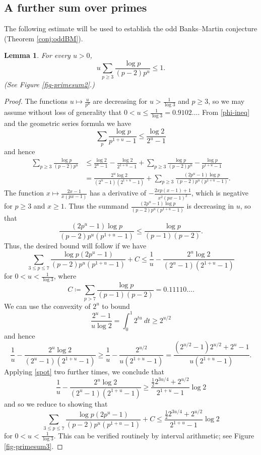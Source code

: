 \documentclass[12pt]{amsart}
\newtheorem{lemma}[theorem]{Lemma}
\theoremstyle{definition}
\theoremstyle{remark}
\numberwithin{equation}{section}
\newcommand{\1}{{\mathbf 1}}
\begin{document}
\subsection{A further sum over primes}


The following estimate will be used to establish the odd Banks--Martin conjecture (Theorem \ref{conj:oddBM}).

\begin{lemma} \label{lem:oddzeta}
    For every $u > 0$,
\begin{equation}\label{om2}
u \sum_{p \geq 3} \frac{\log p}{(p-2) p^u} \leq 1.
\end{equation}
(See Figure \ref{fig-primesum2}.)
\end{lemma}

\begin{proof}  The functions $u \mapsto \frac{u}{p^u}$ are decreasing for $u > \frac{1}{\log 3}$ and $p \geq 3$, so we may assume without loss of generality that $0 < u \leq \frac{1}{\log 3} = 0.9102\dots$.  From \eqref{phi-ineq} and the geometric series formula we have
$$ \sum_p \frac{\log p}{p^{1+u}-1} \leq \frac{\log 2}{2^u-1}$$
and hence
\begin{align*}
\sum_{p \geq 3} \frac{\log p}{(p-2) p^u} &\leq \frac{\log 2}{2^u-1} - \frac{\log 2}{2^{1+u}-1} + \sum_{p \geq 3} \frac{\log p}{(p-2) p^u} - \frac{\log p}{p^{1+u}-1} \\
    &= \frac{2^u \log 2}{(2^u-1) (2^{1+u}-1)} + \sum_{p \geq 3} \frac{(2p^u - 1)\log p }{(p-2)p^u (p^{1+u}-1)}.
\end{align*}
The function $x \mapsto \frac{2x-1}{x(px-1)}$ has a derivative of $-\frac{2xp(x-1)+1}{x^2 (px-1)^2}$, which is negative for $p \geq 3$ and $x \geq 1$.  Thus the summand $\frac{ (2p^u - 1)\log p }{(p-2)p^u (p^{1+u}-1)}$ is decreasing in $u$, so that
$$ \frac{(2p^u - 1)\log p }{(p-2)p^u (p^{1+u}-1)} \leq \frac{\log p}{(p-1) (p-2)}.$$
Thus, the desired bound will follow if we have
$$
\sum_{3 \leq p \leq 7} \frac{\log p (2p^u - 1)}{(p-2)p^u (p^{1+u}-1)} + C \leq \frac{1}{u} - \frac{2^u \log 2}{(2^u-1) (2^{1+u}-1)}
$$
for $0 < u < \frac{1}{\log 3}$, where
$$ C \coloneq \sum_{p > 7} \frac{\log p}{(p-1) (p-2)} = 0.11110\dots.$$
We can use the convexity of $2^u$ to bound
\begin{equation}\label{spot}
\frac{2^u - 1}{u \log 2} = \int_0^1 2^{tu}\ dt \geq 2^{u/2}
\end{equation}
and hence
$$ \frac{1}{u} - \frac{2^u \log 2}{(2^u-1) (2^{1+u}-1)} \geq \frac{1}{u} - \frac{2^{u/2}}{u(2^{1+u}-1)}
= \frac{(2^{u/2}-1)2^{u/2} + 2^u -1}{u(2^{1+u}-1)}.$$
Applying  \eqref{spot} two further times, we conclude that
$$ \frac{1}{u} - \frac{2^u \log 2}{(2^u-1) (2^{1+u}-1)} \geq \frac{\frac{1}{2} 2^{3u/4} + 2^{u/2}}{2^{1+u}-1} \log 2$$
and so we reduce to showing that
\begin{equation}\label{analytic}
\sum_{3 \leq p \leq 7} \frac{\log p (2p^u - 1)}{(p-2)p^u (p^{1+u}-1)} + C \leq 
\frac{\frac{1}{2} 2^{3u/4} + 2^{u/2}}{2^{1+u}-1} \log 2
\end{equation}
for $0 < u < \frac{1}{\log 3}$.  This can be verified routinely by interval arithmetic; see Figure \ref{fig-primesum3}.
\end{proof}
\end{document}
